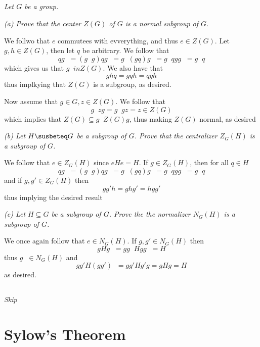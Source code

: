 \documentclass[11pt,oneside,titlepage]{book}
\DeclareMathOperator \inv {^{-1}}
\begin{document}
\subsection{}

\textit{Let $G$ be a group.}

\textit{(a) Prove that the center $Z(G)$ of $G$ is a normal subgroup of $G$.}

We follwo that $e$ commutees with evverything, and thus $e \in Z(G)$.
Let $g, h \in Z(G)$, then let $q$ be arbitrary. We follow that
$$q g\inv = (g\inv g )q g\inv = g\inv (g q) g\inv = g\inv qg  g\inv = g\inv q$$
which gives us that $g\inv in Z(G)$. We also have that
$$ghq = gqh = qgh$$
thus implkying that $Z(G)$ is a subgroup, as desired.

Now assume that $g \in G, z \in Z(G)$. We follow that
$$g\inv z g = g\inv g z = z \in Z(G)$$
which implies that $Z(G) \subseteq g\inv Z(G) g$, thus making $Z(G)$
normal, as desired

\textit{(b) Let $H \susbeteq G$ be a subgroup of $G$. Prove that
  the centralizer $Z_G(H)$ is a subgroup of $G$. }

We follow that $e \in Z_G(H)$ since $eHe = H$. If $g \in Z_G(H)$, then
for all $q \in H$
$$q g\inv = (g\inv g )q g\inv = g\inv (g q) g\inv = g\inv qg  g\inv = g\inv q$$
and if $g, g' \in Z_G(H)$ then
$$gg'h = ghg' = hgg'$$
thus implying the desired result

\textit{(c) Let $H \subseteq G$ be a subgroup of $G$.  Prove the the
  normalizer $N_G(H)$ is a subgroup of $G$.}

We once again follow that $e \in N_G(H)$. If $g, g' \in N_G(H)$ then
$$g H g\inv = g g\inv H g g\inv = H$$
thus $g\inv \in N_G(H)$ and
$$g g' H (g g') \inv = g g' H g' g = g H g = H$$
as desired.

\subsection{}

\textit{Skip}

\section{Sylow's Theorem}
\end{document}
